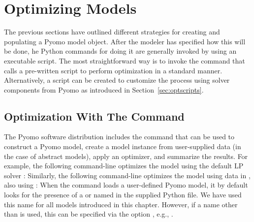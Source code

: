 \section{Optimizing Models}
\label{chap:overview:pyomo}

The previous sections have outlined different strategies for creating
and populating a Pyomo model object.  After the modeler has specified how this
will be done, he Python commands for doing it are generally invoked by using an executable script.
The most straightforward way is to invoke the  command that calls a
pre-written script to perform optimization in a standard manner. 
Alternatively, a script can be created to customize the process using solver components
from Pyomo as introduced in Section~\ref{sec:optscripts}.


\subsection{Optimization With The  Command \label{sec:pyomocommand}}

The Pyomo software distribution includes the  command that can be used
to construct a Pyomo model, create a model instance from user-supplied data (in
the case of abstract models), apply an optimizer, and summarize the results.  For 
example, the following command-line optimizes the  model using
the default LP solver :
Similarly, the following command-line optimizes the  model using
data in , also using :
When the  command loads a user-defined Pyomo model, it by default looks for
the presence of a  or  named 
in the supplied Python file. We have used this name for all models introduced in this 
chapter. However, if a name other than  is used, this can be specified via 
the  option ,  
e.g., .

